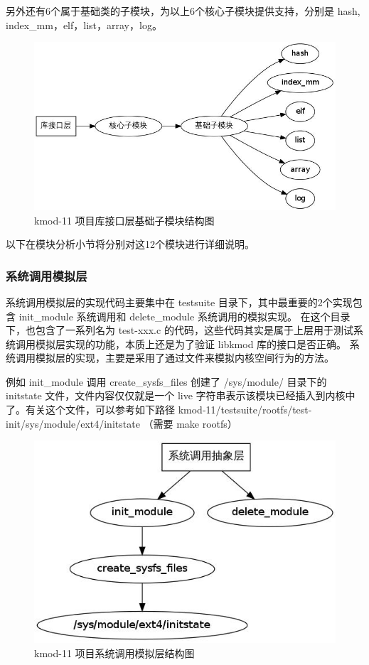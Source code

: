 \documentclass[11pt,a4paper]{article}
\makeatletter
\def\maxwidth{\ifdim\Gin@nat@width>\linewidth\linewidth
\else\Gin@nat@width\fi}
\let\Oldincludegraphics\includegraphics
\renewcommand{\includegraphics}[1]{\Oldincludegraphics[width=\maxwidth]{#1}}
\makeatother
\begin{document}
另外还有6个属于基础类的子模块，为以上6个核心子模块提供支持，分别是 hash,
index\_mm，elf，list，array，log。

\begin{figure}[htbp]
\centering
\includegraphics{./figures/2-base.jpg}
\caption{kmod-11 项目库接口层基础子模块结构图}
\end{figure}

以下在模块分析小节将分别对这12个模块进行详细说明。

\subsubsection{系统调用模拟层}

系统调用模拟层的实现代码主要集中在 testsuite
目录下，其中最重要的2个实现包含 init\_module 系统调用和 delete\_module
系统调用的模拟实现。 在这个目录下，也包含了一系列名为 test-xxx.c
的代码，这些代码其实是属于上层用于测试系统调用模拟层实现的功能，本质上还是为了验证
libkmod 库的接口是否正确。
系统调用模拟层的实现，主要是采用了通过文件来模拟内核空间行为的方法。

例如 init\_module 调用 create\_sysfs\_files 创建了 /sys/module/ 目录下的
initstate 文件，文件内容仅仅就是一个 live
字符串表示该模块已经插入到内核中了。有关这个文件，可以参考如下路径
kmod-11/testsuite/rootfs/test-init/sys/module/ext4/initstate （需要 make
rootfs）

\begin{figure}[htbp]
\centering
\includegraphics{./figures/3-syscall.jpg}
\caption{kmod-11 项目系统调用模拟层结构图}
\end{figure}
\end{document}
